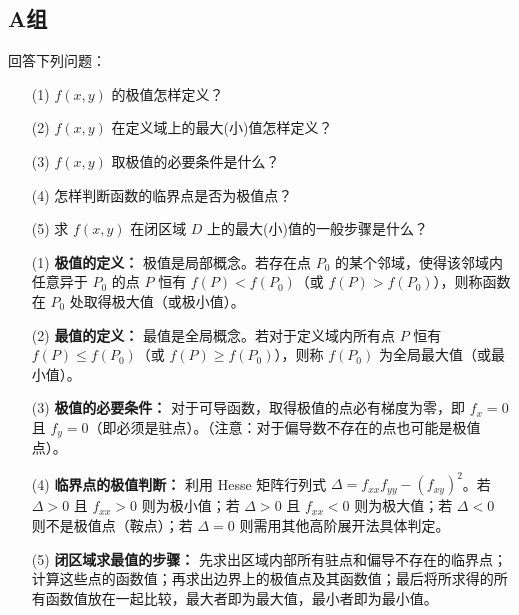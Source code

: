\documentclass[lang=cn,11pt]{elegantbook}
\begin{document}
\subsection*{A组}

\begin{exercise}[概念问答]
回答下列问题：
\begin{enumerate}
    \item[(1)] $f(x,y)$ 的极值怎样定义？
    \item[(2)] $f(x,y)$ 在定义域上的最大(小)值怎样定义？
    \item[(3)] $f(x,y)$ 取极值的必要条件是什么？
    \item[(4)] 怎样判断函数的临界点是否为极值点？
    \item[(5)] 求 $f(x,y)$ 在闭区域 $D$ 上的最大(小)值的一般步骤是什么？
\end{enumerate}
\end{exercise}

\begin{solution}
\begin{enumerate}
  \item[(1)] \textbf{极值的定义：} 极值是局部概念。若存在点 $P_0$ 的某个邻域，使得该邻域内任意异于 $P_0$ 的点 $P$ 恒有 $f(P) < f(P_0)$（或 $f(P) > f(P_0)$），则称函数在 $P_0$ 处取得极大值（或极小值）。
  \item[(2)] \textbf{最值的定义：} 最值是全局概念。若对于定义域内所有点 $P$ 恒有 $f(P) \leq f(P_0)$（或 $f(P) \geq f(P_0)$），则称 $f(P_0)$ 为全局最大值（或最小值）。
  \item[(3)] \textbf{极值的必要条件：} 对于可导函数，取得极值的点必有梯度为零，即 $f_x=0$ 且 $f_y=0$（即必须是驻点）。（注意：对于偏导数不存在的点也可能是极值点）。
  \item[(4)] \textbf{临界点的极值判断：} 利用 Hesse 矩阵行列式 $\Delta = f_{xx}f_{yy} - (f_{xy})^2$。若 $\Delta > 0$ 且 $f_{xx} > 0$ 则为极小值；若 $\Delta > 0$ 且 $f_{xx} < 0$ 则为极大值；若 $\Delta < 0$ 则不是极值点（鞍点）；若 $\Delta = 0$ 则需用其他高阶展开法具体判定。
  \item[(5)] \textbf{闭区域求最值的步骤：} 先求出区域内部所有驻点和偏导不存在的临界点；计算这些点的函数值；再求出边界上的极值点及其函数值；最后将所求得的所有函数值放在一起比较，最大者即为最大值，最小者即为最小值。
\end{enumerate}
\end{solution}
\end{document}
